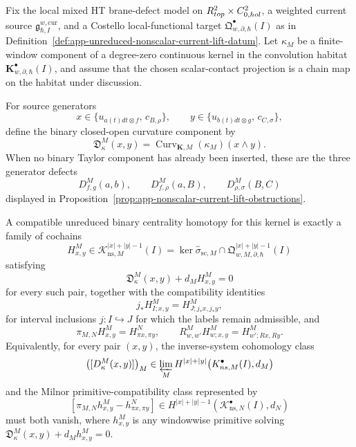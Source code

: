\begin{thm}
\label{thm:app-curved-kernel-centrality-homotopy-criterion}
  Fix the local mixed HT brane-defect model on
  \(\R^2_{\mathrm{top}}\times\widehat{\C^2}_{0,\mathrm{hol}}\), a
  weighted current source
  \(\mathfrak g^{w,\mathrm{cur}}_{\hbar,I}\), and a Costello
  local-functional target
  \(\mathfrak Q^\bullet_{w,\partial,\hbar}(I)\) as in
  Definition~\ref{def:app-unreduced-nonscalar-current-lift-datum}.  Let
  \(\kappa_M\) be a finite-window component of a degree-zero continuous
  kernel in the convolution habitat
  \(\mathbf K^\bullet_{w,\partial,\hbar}(I)\), and assume that the chosen
  scalar-contact projection is a chain map on the habitat under
  discussion.

  For source generators
  \[
    x\in\{u_{a(t)dt\otimes f},\,c_{B,\rho}\},\qquad
    y\in\{u_{b(t)dt\otimes g},\,c_{C,\sigma}\},
  \]
  define the binary closed-open curvature component by
  \[
    \mathfrak D^M_\kappa(x,y)
      =
    \operatorname{Curv}_{\mathbf K,M}(\kappa_M)(x\wedge y).
  \]
  When no binary Taylor component has already been inserted, these are the
  three generator defects
  \[
    D^M_{f,g}(a,b),\qquad
    D^M_{f,\rho}(a,B),\qquad
    D^M_{\rho,\sigma}(B,C)
  \]
  displayed in
  Proposition~\ref{prop:app-nonscalar-current-lift-obstructions}.

  A compatible unreduced binary centrality homotopy for this kernel is
  exactly a family of cochains
  \[
    H^M_{x,y}\in
    \mathcal K^{|x|+|y|-1}_{\mathrm{ns},M}(I)
      =
    \ker\widehat\sigma_{\mathrm{sc},M}
      \cap
    \mathfrak Q^{|x|+|y|-1}_{w,M,\partial,\hbar}(I)
  \]
  satisfying
  \begin{equation}
    \mathfrak D^M_\kappa(x,y)+d_M H^M_{x,y}=0
    \label{eq:app-centrality-homotopy-equation}
  \end{equation}
  for every such pair, together with the compatibility identities
  \[
    j_*H^M_{I;x,y}
      =
    H^M_{J;j_*x,j_*y},
  \]
  for interval inclusions \(j:I\hookrightarrow J\) for which the labels
  remain admissible, and
  \[
    \pi_{M,N}H^M_{x,y}=H^N_{\pi x,\pi y},
    \qquad
    R^M_{w,w'}H^M_{w;x,y}=H^M_{w';Rx,Ry}.
  \]
  Equivalently, for every pair \((x,y)\), the inverse-system cohomology
  class
  \[
    \bigl([\mathfrak D^M_\kappa(x,y)]\bigr)_M
    \in
    \varprojlim_M
    H^{|x|+|y|}\!
    \left(\mathcal K^\bullet_{\mathrm{ns},M}(I),d_M\right)
  \]
  and the Milnor primitive-compatibility class represented by
  \[
    \left[
      \pi_{M,N}h^M_{x,y}-h^N_{\pi x,\pi y}
    \right]
    \in
    H^{|x|+|y|-1}
    \left(\mathcal K^\bullet_{\mathrm{ns},N}(I),d_N\right)
  \]
  must both vanish, where \(h^M_{x,y}\) is any windowwise primitive
  solving
  \(\mathfrak D^M_\kappa(x,y)+d_M h^M_{x,y}=0\).


\end{thm}
